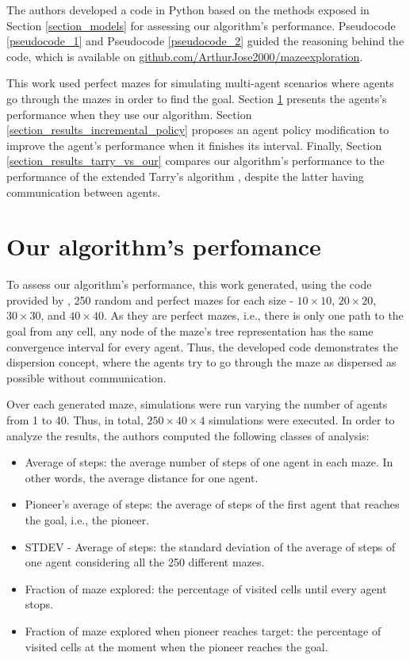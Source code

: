 \label{section_results}
The authors developed a code in Python based on the methods exposed in Section \ref{section_models} for assessing our algorithm's performance. Pseudocode \ref{pseudocode_1} and Pseudocode \ref{pseudocode_2} guided the reasoning behind the code, which is available on \href{https://github.com/ArthurJose2000/mazeexploration}{github.com/ArthurJose2000/mazeexploration}.

This work used perfect mazes for simulating multi-agent scenarios where agents go through the mazes in order to find the goal. Section \ref{section_results_our_performance} presents the agents's performance when they use our algorithm. Section \ref{section_results_incremental_policy} proposes an agent policy modification to improve the agent's performance when it finishes its interval. Finally, Section \ref{section_results_tarry_vs_our} compares our algorithm's performance to the performance of the extended Tarry's algorithm \cite{KivelevitchCohen2010}, despite the latter having communication between agents.

\section{Our algorithm's perfomance}
\label{section_results_our_performance}

To assess our algorithm's performance, this work generated, using the code provided by , 250 random and perfect mazes for each size - $10 \times 10$, $20 \times 20$, $30 \times 30$, and $40 \times 40$. As they are perfect mazes, i.e., there is only one path to the goal from any cell, any node of the maze's tree representation has the same convergence interval for every agent. Thus, the developed code demonstrates the dispersion concept, where the agents try to go through the maze as dispersed as possible without communication.

Over each generated maze, simulations were run varying the number of agents from 1 to 40. Thus, in total, $250\times 40\times 4$ simulations were executed. In order to analyze the results, the authors computed the following classes of analysis:

\begin{itemize}
\item Average of steps: the average number of steps of one agent in each maze. In other words, the average distance for one agent.

\item Pioneer's average of steps: the average of steps of the first agent that reaches the goal, i.e., the pioneer.

\item STDEV - Average of steps: the standard deviation of the average of steps of one agent considering all the 250 different mazes.

\item Fraction of maze explored: the percentage of visited cells until every agent stops.

\item Fraction of maze explored when pioneer reaches target: the percentage of visited cells at the moment when the pioneer reaches the goal.
\end{itemize}

